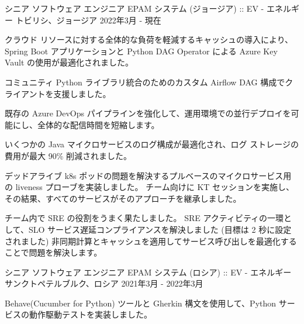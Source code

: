 

\begin{cventries}

  \cventry
    {シニア ソフトウェア エンジニア} %
    {EPAM システム (ジョージア) :: EV - エネルギー} %
    {トビリシ、ジョージア} %
    {2022年3月 - 現在} %
    {
      \begin{cvitems} %
        \item {クラウド リソースに対する全体的な負荷を軽減するキャッシュの導入により、Spring Boot アプリケーションと Python DAG Operator による Azure Key Vault の使用が最適化されました。}
        \item {コミュニティ Python ライブラリ統合のためのカスタム Airflow DAG 構成でクライアントを支援しました。}
        \item {既存の Azure DevOps パイプラインを強化して、運用環境での並行デプロイを可能にし、全体的な配信時間を短縮します。}
        \item {いくつかの Java マイクロサービスのログ構成が最適化され、ログ ストレージの費用が最大 90\% 削減されました。}
        \item {デッドアライブ k8s ポッドの問題を解決するプルベースのマイクロサービス用の liveness プローブを実装しました。
        チーム向けに KT セッションを実施し、その結果、すべてのサービスがそのアプローチを継承しました。}
        \item {チーム内で SRE の役割をうまく果たしました。 SRE アクティビティの一環として、SLO サービス遅延コンプライアンスを解決しました (目標は 2 秒に設定されました)
        非同期計算とキャッシュを適用してサービス呼び出しを最適化することで問題を解決します。}
      \end{cvitems}
    }
\cventry
{シニア ソフトウェア エンジニア} %
{EPAM システム (ロシア) ::  EV - エネルギー} %
{サンクトペテルブルク、ロシア} %
{2021年3月 - 2022年3月} %
{
  \begin{cvitems} %
    \item {Behave(Cucumber for Python) ツールと Gherkin 構文を使用して、Python サービスの動作駆動テストを実装しました。}

\end{cvitems}}
\end{cventries}
